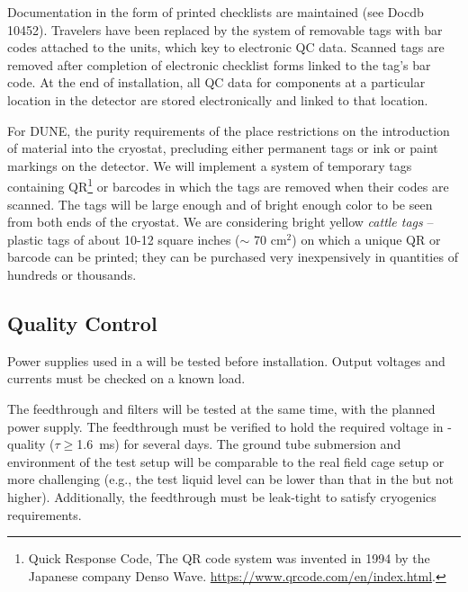 
Documentation in the form of printed checklists are maintained (see Docdb 10452). Travelers have been replaced by the system of removable tags with bar codes attached to the units, which key to electronic QC data.  Scanned tags are removed after completion of electronic checklist forms linked to the tag's bar code.  At the end of  installation, all QC data for components at a particular location in the detector are stored electronically and linked to that location.

For DUNE, the purity requirements of the \lar place restrictions on the introduction of material into the cryostat, precluding either permanent tags or ink or paint markings on the detector.  We will implement a system of temporary tags containing QR\footnote{Quick Response Code, The QR\texttrademark{} code system was invented in 1994 by the Japanese company Denso Wave. \url{https://www.qrcode.com/en/index.html}.} %
or barcodes in which the tags are removed when their codes are scanned.  %
%
The tags will be large enough and of bright enough color to be seen from both ends of the cryostat.  We are considering %
bright yellow \textit{cattle tags} -- plastic tags of about 10-12 square inches ($\sim$ 70 cm$^{2}$) on which a unique QR or barcode can be printed; they can be purchased very inexpensively in quantities of hundreds or thousands.

\subsection{Quality Control}
\label{sec:fdsp-hv-transport-QC}

Power supplies used in a  will be tested before installation.  Output voltages and currents must be checked on a known load. 

The feedthrough and filters will be tested at the same time, with the planned power supply.  The feedthrough must be verified to hold the required voltage in -quality  ($\tau\geq$\SI{1.6}{ms}) for several days.  The ground tube submersion and \efield{} environment of the test setup will be comparable to the real field cage setup or more challenging (e.g., the test liquid level can be lower than that in the  but not higher).  Additionally, the feedthrough must be leak-tight to satisfy cryogenics requirements.

